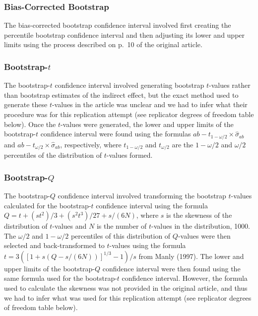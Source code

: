 \documentclass[10,a4paperpaper,]{article}
\begin{document}
\subsubsection{Bias-Corrected Bootstrap}

The bias-corrected bootstrap confidence interval involved first creating
the percentile bootstrap confidence interval and then adjusting its
lower and upper limits using the process described on p.~10 of the
original article.

\subsubsection{Bootstrap-$t$}

The bootstrap-\(t\) confidence interval involved generating bootstrap
\(t\)-values rather than bootstrap estimates of the indirect effect, but
the exact method used to generate these \(t\)-values in the article was
unclear and we had to infer what their procedure was for this
replication attempt (see replicator degrees of freedom table below).
Once the \(t\)-values were generated, the lower and upper limits of the
bootstrap-\(t\) confidence interval were found using the formulas
\(ab - t_{1-\omega/2} \times \hat{\sigma}_{ab}\) and
\(ab - t_{\omega/2} \times \hat{\sigma}_{ab}\), respectively, where
\(t_{1-\omega/2}\) and \(t_{\omega/2}\) are the \(1-\omega/2\) and
\(\omega/2\) percentiles of the distribution of \(t\)-values formed.

\subsubsection{Bootstrap-$Q$}

The bootstrap-\(Q\) confidence interval involved transforming the
bootstrap \(t\)-values calculated for the bootstrap-\(t\) confidence
interval using the formula \(Q = t + (st^2)/3 + (s^2t^3)/27 + s/(6N)\),
where \(s\) is the skewness of the distribution of \(t\)-values and
\(N\) is the number of \(t\)-values in the distribution, 1000. The
\(\omega/2\) and \(1-\omega/2\) percentiles of this distribution of
\(Q\)-values were then selected and back-transformed to \(t\)-values
using the formula \(t = 3([1+s(Q - s/(6N))]^{1/3} - 1)/s\) from Manly
(1997). The lower and upper limits of the bootstrap-\(Q\) confidence
interval were then found using the same formula used for the
bootstrap-\(t\) confidence interval. However, the formula used to
calculate the skewness was not provided in the original article, and
thus we had to infer what was used for this replication attempt (see
replicator degrees of freedom table below).
\end{document}
